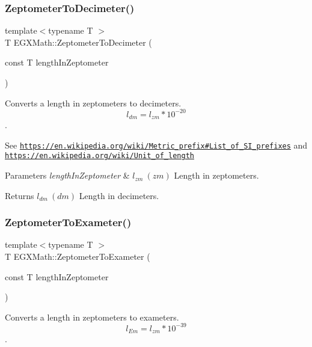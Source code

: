 \subsubsection{\texorpdfstring{Zeptometer\+To\+Decimeter()}{ZeptometerToDecimeter()}}
{\footnotesize\ttfamily template$<$typename T $>$ \\
T E\+G\+X\+Math\+::\+Zeptometer\+To\+Decimeter (\begin{DoxyParamCaption}\item[{const T}]{length\+In\+Zeptometer }\end{DoxyParamCaption})}



Converts a length in zeptometers to decimeters. \[ l_{dm}=l_{zm} * 10^{-20} \]. 

See \href{https://en.wikipedia.org/wiki/Metric_prefix#List_of_SI_prefixes}{\tt https\+://en.\+wikipedia.\+org/wiki/\+Metric\+\_\+prefix\#\+List\+\_\+of\+\_\+\+S\+I\+\_\+prefixes} and \href{https://en.wikipedia.org/wiki/Unit_of_length}{\tt https\+://en.\+wikipedia.\+org/wiki/\+Unit\+\_\+of\+\_\+length} 
\begin{DoxyParams}{Parameters}
{\em length\+In\+Zeptometer} & $ l_{zm}\ (zm)$ Length in zeptometers. \\
\hline
\end{DoxyParams}
\begin{DoxyReturn}{Returns}
$ l_{dm}\ (dm)$ Length in decimeters. 
\end{DoxyReturn}
\mbox{\label{group___e_g_x_math-_conversions-_length_conversions-_s_i-_zeptometer-_s_i_ga28d70f8fb1a2876c4c8553348c78925d}} 
\subsubsection{\texorpdfstring{Zeptometer\+To\+Exameter()}{ZeptometerToExameter()}}
{\footnotesize\ttfamily template$<$typename T $>$ \\
T E\+G\+X\+Math\+::\+Zeptometer\+To\+Exameter (\begin{DoxyParamCaption}\item[{const T}]{length\+In\+Zeptometer }\end{DoxyParamCaption})}



Converts a length in zeptometers to exameters. \[ l_{Em}=l_{zm} * 10^{-39} \]. 

